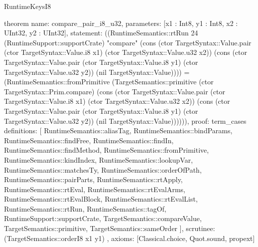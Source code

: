 \begin{lexlean}{RuntimeKeysI8}
\begin{semanticmodule}
theorem{
  name: compare_pair_i8_u32,
  parameters: [x1 : Int8, y1 : Int8, x2 : UInt32, y2 : UInt32],
  statement: ((RuntimeSemantics::rtRun 24 (RuntimeSupport::supportCrate) "compare" (cons (ctor TargetSyntax::Value.pair (ctor TargetSyntax::Value.i8 x1) (ctor TargetSyntax::Value.u32 x2)) (cons (ctor TargetSyntax::Value.pair (ctor TargetSyntax::Value.i8 y1) (ctor TargetSyntax::Value.u32 y2)) (nil TargetSyntax::Value)))) = (RuntimeSemantics::fromPrimitive (TargetSemantics::primitive (ctor TargetSyntax::Prim.compare) (cons (ctor TargetSyntax::Value.pair (ctor TargetSyntax::Value.i8 x1) (ctor TargetSyntax::Value.u32 x2)) (cons (ctor TargetSyntax::Value.pair (ctor TargetSyntax::Value.i8 y1) (ctor TargetSyntax::Value.u32 y2)) (nil TargetSyntax::Value)))))),
  proof: term_cases{
    definitions: [
      RuntimeSemantics::aliasTag,
      RuntimeSemantics::bindParams,
      RuntimeSemantics::findFree,
      RuntimeSemantics::findIn,
      RuntimeSemantics::findMethod,
      RuntimeSemantics::fromPrimitive,
      RuntimeSemantics::kindIndex,
      RuntimeSemantics::lookupVar,
      RuntimeSemantics::matchesTy,
      RuntimeSemantics::orderOfPath,
      RuntimeSemantics::pairParts,
      RuntimeSemantics::rtApply,
      RuntimeSemantics::rtEval,
      RuntimeSemantics::rtEvalArms,
      RuntimeSemantics::rtEvalBlock,
      RuntimeSemantics::rtEvalList,
      RuntimeSemantics::rtRun,
      RuntimeSemantics::tagOf,
      RuntimeSupport::supportCrate,
      TargetSemantics::compareValue,
      TargetSemantics::primitive,
      TargetSemantics::sameOrder
    ],
    scrutinee: (TargetSemantics::orderI8 x1 y1)
  },
  axioms: [Classical.choice, Quot.sound, propext]
}


\end{semanticmodule}
\end{lexlean}
